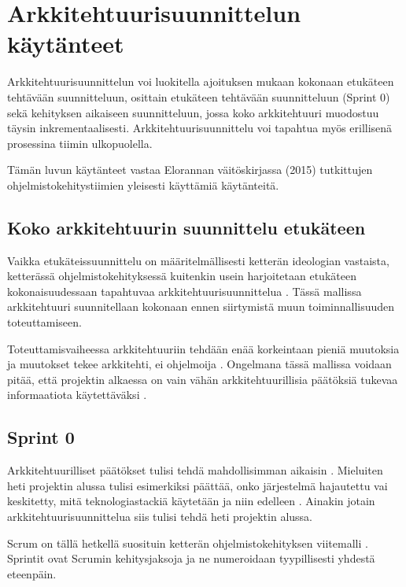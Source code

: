 \chapter{Arkkitehtuurisuunnittelun käytänteet}

Arkkitehtuurisuunnittelun voi luokitella ajoituksen mukaan kokonaan etukäteen tehtävään suunnitteluun, osittain etukäteen tehtävään suunnitteluun (Sprint 0) sekä kehityksen aikaiseen suunnitteluun, jossa koko arkkitehtuuri muodostuu täysin inkrementaalisesti. Arkkitehtuurisuunnittelu voi tapahtua myös erillisenä prosessina tiimin ulkopuolella.

Tämän luvun käytänteet vastaa Elorannan väitöskirjassa (2015) tutkittujen ohjelmistokehitystiimien yleisesti käyttämiä käytänteitä.

\section{Koko arkkitehtuurin suunnittelu etukäteen}
Vaikka etukäteissuunnittelu on määritelmällisesti ketterän ideologian vastaista, ketterässä ohjelmistokehityksessä kuitenkin usein harjoitetaan etukäteen kokonaisuudessaan tapahtuvaa arkkitehtuurisuunnittelua \citep{rost_distilling_2015, eloranta2015techniques}. Tässä mallissa arkkitehtuuri suunnitellaan kokonaan ennen siirtymistä muun toiminnallisuuden toteuttamiseen. 

Toteuttamisvaiheessa arkkitehtuuriin tehdään enää korkeintaan pieniä muutoksia ja muutokset tekee arkkitehti, ei ohjelmoija \citep{eloranta2015techniques}. Ongelmana tässä mallissa voidaan pitää, että projektin alkaessa on vain vähän arkkitehtuurillisia päätöksiä tukevaa informaatiota käytettäväksi \citep{waterman_how_2015}.

\section{Sprint 0}

Arkkitehtuurilliset päätökset tulisi tehdä mahdollisimman aikaisin \citep{abrahamsson2010agility}. Mieluiten heti projektin alussa tulisi esimerkiksi päättää, onko järjestelmä hajautettu vai keskitetty, mitä teknologiastackiä käytetään ja niin edelleen \citep{eloranta2015techniques}. Ainakin jotain arkkitehtuurisuunnittelua siis tulisi tehdä heti projektin alussa.

Scrum on tällä hetkellä suosituin ketterän ohjelmistokehityksen viitemalli \citep{noauthor_14th_2020}. Sprintit ovat Scrumin kehitysjaksoja ja ne numeroidaan tyypillisesti yhdestä eteenpäin.

